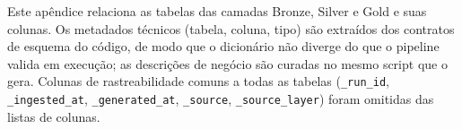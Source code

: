 Este apêndice relaciona as tabelas das camadas Bronze, Silver e Gold e suas colunas. Os metadados técnicos (tabela, coluna, tipo) são extraídos dos contratos de esquema do código, de modo que o dicionário não diverge do que o pipeline valida em execução; as descrições de negócio são curadas no mesmo script que o gera. Colunas de rastreabilidade comuns a todas as tabelas (\texttt{\_run\_id}, \texttt{\_ingested\_at}, \texttt{\_generated\_at}, \texttt{\_source}, \texttt{\_source\_layer}) foram omitidas das listas de colunas.

